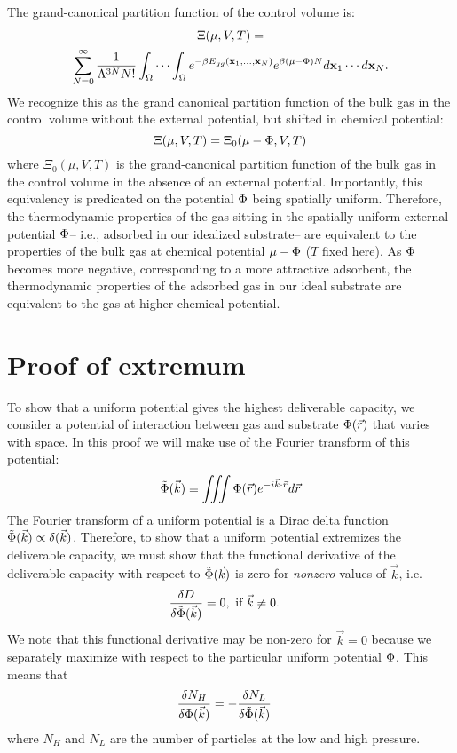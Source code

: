 The grand-canonical partition function of the control volume is:
\begin{multline}
    \Xi(\mu, V, T)= \\ \displaystyle \sum_{N=0}^\infty \frac{1}{\Lambda^{3N}N!} \int_{\Omega} \cdots \int_{\Omega} e^{-\beta E_{gg}(\mathbf{x}_1, ..., \mathbf{x}_N)} e^{\beta (\mu - \Phi) N} d\mathbf{x}_1 \cdots d\mathbf{x}_N.
    \label{eq:gcpf}
\end{multline} We recognize this as the grand canonical partition function of the bulk gas in the control volume without the external potential, but shifted in chemical potential:
\begin{equation}
    \Xi(\mu, V, T)=\Xi_0(\mu - \Phi, V, T)
    \label{eq:xi_vs_xi0}
\end{equation}
where $\Xi_0(\mu, V, T)$ is the grand-canonical partition function of the bulk gas in the control volume in the absence of an external potential. Importantly, this equivalency is predicated on the potential $\Phi$ being spatially uniform. Therefore, the thermodynamic properties of the gas sitting in the spatially uniform external potential $\Phi$-- i.e., adsorbed in our idealized substrate-- are equivalent to the properties of the bulk gas at chemical potential $\mu-\Phi$ ($T$ fixed here). 
As $\Phi$ becomes more negative, corresponding to a more attractive adsorbent, the thermodynamic properties of the adsorbed gas in our ideal substrate are equivalent to the gas at higher chemical potential.

\section{Proof of extremum}
To show that a uniform potential gives the highest deliverable capacity, we consider a potential of interaction between gas and substrate $\Phi(\vec r)$ that varies with space.  In this proof we will make use of the Fourier transform of this potential:
\begin{align}
    \tilde\Phi(\vec k) \equiv \iiint \Phi(\vec r) e^{-i\vec k\cdot \vec r} d\vec r
\end{align}
The Fourier transform of a uniform potential is a Dirac delta function $\tilde{\Phi}(\vec k)\propto\delta(\vec k)$. Therefore, to show that a uniform potential extremizes the deliverable capacity, we must show that the functional derivative of the deliverable capacity with respect to $\tilde\Phi(\vec k)$ is zero for \emph{nonzero} values of $\vec k$, i.e.
\begin{align}
    \frac{\delta D}{\delta \tilde\Phi(\vec k)} &= 0, \text{ if } \vec k\ne 0.
\end{align}
We note that this functional derivative may be non-zero for $\vec k=0$ because we separately maximize with respect to the particular uniform potential $\Phi$.
This means that
\begin{align}
    \frac{\delta N_H}{\delta \Phi(\vec k)} &= -\frac{\delta N_L}{\delta \tilde\Phi(\vec k)}
\end{align}
where $N_H$ and $N_L$ are the number of particles at the low and high pressure.

